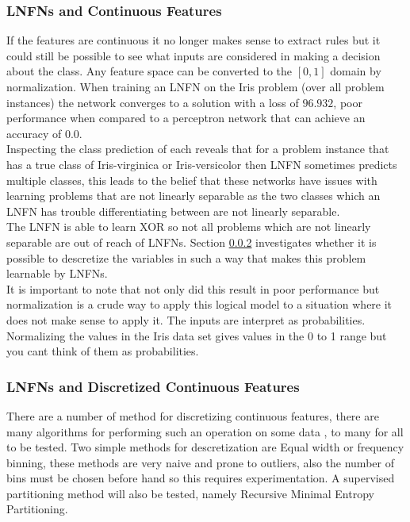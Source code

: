 \subsubsection{LNFNs and Continuous Features} \label{subsubsec:lnfns-cont-features}
If the features are continuous it no longer makes sense to extract rules but it could still be possible to see what inputs are considered in making a decision about the class. Any feature space can be converted to the $[0,1]$ domain by normalization. When training an LNFN on the Iris problem (over all problem instances) the network converges to a solution with a loss of $96.932$, poor performance when compared to a perceptron network that can achieve an accuracy of $0.0$. \\

Inspecting the class prediction of each reveals that for a problem instance that has a true class of Iris-virginica or Iris-versicolor then LNFN sometimes predicts multiple classes, this leads to the belief that these networks have issues with learning problems that are not linearly separable as the two classes which an LNFN has trouble differentiating between are not linearly separable.\\

The LNFN is able to learn XOR so not all problems which are not linearly separable are out of reach of LNFNs. Section \ref{subsubsec:lnfns-desc-cont-features} investigates whether it is possible to descretize the variables in such a way that makes this problem learnable by LNFNs.\\

It is important to note that not only did this result in poor performance but normalization is a crude way to apply this logical model to a situation where it does not make sense to apply it. The inputs are interpret as probabilities. Normalizing the values in the Iris data set gives values in the 0 to 1 range but you cant think of them as probabilities.


\subsubsection{LNFNs and Discretized Continuous Features} \label{subsubsec:lnfns-desc-cont-features}
There are a number of method for discretizing continuous features, there are many algorithms for performing such an operation on some data \cite{liu2002discretization}, to many for all to be tested. Two simple methods for descretization are Equal width or frequency binning, these methods are very naive and prone to outliers, also the number of bins must be chosen before hand so this requires experimentation. A supervised partitioning method will also be tested, namely Recursive Minimal Entropy Partitioning.\\

